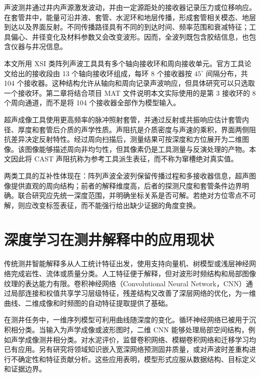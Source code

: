 声波测井通过井内声源激发波动，并由一定源距处的接收器记录压力或位移响应。在套管井中，能量可沿井液、套管、水泥环和地层传播，形成套管相关模态、地层到达以及界面反射。不同传播路径具有不同的到达时间、频率范围和衰减特征；工具偏心、井径变化及材料参数又会改变波形。因而，全波列既包含胶结信息，也包含仪器与井况信息\cite{Wang2016AcousticCementMethods,Wang2017CasedHoleWavefield}。

本文所用 XSI 类阵列声波工具具有多个轴向接收环和周向接收单元。官方工具论文给出的接收段由 13 个轴向接收环组成，每环 8 个接收器按 $45^\circ$ 间隔分布，共 104 个接收器\cite{Sun2016UltrabroadbandAcoustic}。这种结构允许从轴向和周向记录声波响应，但具体研究可以只选取一个接收环。第二章将结合项目 MAT 文件说明本文实际使用的是第 3 接收环的 8 个周向通道，而不是将 104 个接收器全部作为模型输入。

超声成像工具使用更高频率的脉冲照射套管，并通过反射或共振响应估计套管内径、厚度和套管后介质的声学性质。声阻抗是介质密度与声速的乘积，界面两侧阻抗差异决定反射特性。经过周向扫描后，测量结果可按深度和方位展开为二维图像。该图像能够描述周向非均匀性，但其像素仍是工具测量与反演处理的产物\cite{Froelich1982CementEvaluation,Froelich2008MultimodeCement}。本文因此将 CAST 声阻抗称为参考工具派生表征，而不称为窜槽绝对真实值。

两类工具的互补性体现在：阵列声波全波列保留传播过程和多接收器信息，超声图像提供直观的周向结构；前者的解释维度高，后者的探测尺度和套管条件边界明确。联合研究应先统一深度范围，并明确坐标关系是否可解。若绝对方位零点不可解，则应改变标签表征，而不能强行给出缺少证据的角度变换。

\section{深度学习在测井解释中的应用现状}

传统测井智能解释多从人工统计特征出发，使用支持向量机、树模型或浅层神经网络完成岩性、流体或质量分类。人工特征便于解释，但对波形时频结构和局部图像纹理的表达能力有限。卷积神经网络（Convolutional Neural Network，CNN）通过局部连接和权值共享学习层级特征\cite{LeCun1998GradientLearning}，残差结构又改善了深层网络的优化\cite{He2016ResNet}，为一维曲线、二维成像和时频图的自动特征提取提供了基础。

在测井任务中，一维序列模型可利用曲线随深度的变化。循环神经网络已被用于沉积相分类\cite{Santos2022RecurrentFacies}。当输入为声学成像或波形图时，二维 CNN 能够处理局部空间结构，例如声学成像测井相分类\cite{You2023AcousticImageFacies}。对水泥评价，监督卷积网络、模糊卷积网络和迁移学习均已有应用\cite{Viggen2020AutomaticCement,Nezhad2023FuzzyCement,Abdollahian2024TransferCement}。另有研究将领域知识嵌入宽深网络预测固井质量\cite{Liu2025WideDeepCement}，或对声波时差重构进行不确定性和特征贡献分析\cite{Wang2023ExplainableSonic}。这些应用表明，模型形式应服从数据结构、目标定义和证据边界。

